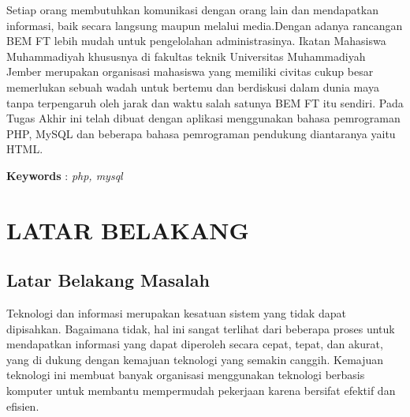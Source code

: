 \documentclass{jtetiproposalskripsi}
\begin{document}
\cover

\approvalpage


\begin{abstractind}
Setiap orang membutuhkan komunikasi dengan orang lain dan mendapatkan informasi, baik secara langsung maupun melalui media.Dengan adanya rancangan BEM FT lebih mudah untuk pengelolahan administrasinya. Ikatan Mahasiswa Muhammadiyah khususnya di fakultas teknik Universitas Muhammadiyah Jember merupakan organisasi mahasiswa yang memiliki civitas cukup besar memerlukan sebuah wadah untuk bertemu dan berdiskusi dalam dunia maya tanpa terpengaruh oleh jarak dan waktu salah satunya BEM FT itu sendiri. Pada Tugas Akhir ini telah dibuat dengan aplikasi menggunakan bahasa pemrograman PHP, MySQL dan beberapa bahasa pemrograman pendukung diantaranya yaitu HTML.

\bigskip
\textbf{Keywords} : \emph{php, mysql}
\end{abstractind}

\tableofcontents
{}
\clearpage{}\setcounter{page}{1}

\chapter{LATAR BELAKANG}

\section{Latar Belakang Masalah}

Teknologi dan informasi merupakan kesatuan sistem yang tidak dapat dipisahkan. Bagaimana tidak, hal ini sangat terlihat dari beberapa proses untuk mendapatkan informasi yang dapat diperoleh secara cepat, tepat, dan akurat, yang di dukung dengan kemajuan teknologi yang semakin canggih. Kemajuan teknologi ini membuat banyak organisasi menggunakan teknologi berbasis komputer untuk membantu mempermudah pekerjaan karena bersifat efektif dan efisien. 
\end{document}
